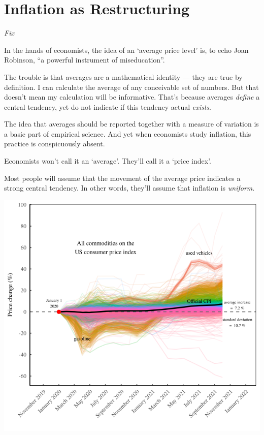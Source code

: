 \documentclass[
]{book}
\begin{document}
\hypertarget{inflation-as-restructuring}{%
\section{Inflation as Restructuring}\label{inflation-as-restructuring}}

\emph{Fix}

In the hands of economists, the idea of an `average price level' is, to echo Joan Robinson, ``a powerful instrument of miseducation''.

The trouble is that averages are a mathematical identity --- they are true by definition. I can calculate the average of any conceivable set of numbers. But that doesn't mean my calculation will be informative. That's because averages \emph{define} a central tendency, yet do not indicate if this tendency actual \emph{exists}.

The idea that averages should be reported together with a measure of variation is a basic part of empirical science. And yet when economists study inflation, this practice is conspicuously absent.

Economists won't call it an `average'. They'll call it a `price index'.

Most people will assume that the movement of the average price indicates a strong central tendency. In other words, they'll assume that inflation is \emph{uniform}.

\includegraphics{fig/inflation_2020_all.png}
\end{document}
